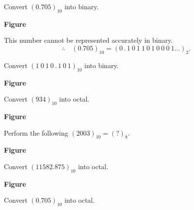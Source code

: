 \begin{problem}\label{prob5.7}
Convert $(0.705)_{10}$ into binary.
\end{problem}

\begin{solution}
\begin{center}
{\bf Figure}
\end{center}

This number cannot be represented accurately in binary.
$$
\therefore\quad (0.705)_{10}=(0\,.\,1~0~1~1~0~1~0~0~0~1\ldots)_{2}.
$$
\end{solution}

\begin{problem}\label{prob5.8}
Convert $(1~0~1~0\,.\,1~0~1)_{10}$ into binary.
\end{problem}

\begin{solution}
\begin{center}
{\bf Figure}
\end{center}
\end{solution}

\begin{problem}\label{prob5.9}
Convert $(934)_{10}$ into octal.
\end{problem}

\begin{solution}
\begin{center}
{\bf Figure}
\end{center}
\end{solution}

\begin{problem}\label{prob5.10}
Perform the following $(2003)_{10}=(?)_{8}$.
\end{problem}

\begin{solution}
\begin{center}
{\bf Figure}
\end{center}
\end{solution}

\begin{problem}\label{prob5.11}
Convert $(11582.875)_{10}$ into octal.
\end{problem}

\begin{solution}
\begin{center}
{\bf Figure}
\end{center}
\end{solution}

\begin{problem}\label{prob5.12}
Convert $(0.705)_{10}$ into octal.
\end{problem}

